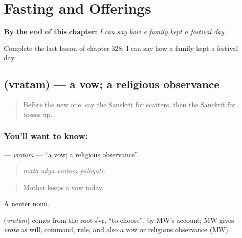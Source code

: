 
\chapter{Fasting and Offerings}
\label{ch:sa-fasting-and-offerings}

\begin{chapteropening}
\textbf{By the end of this chapter:} \emph{I can say how a family kept a festival day.}

Complete the last lesson of chapter 328: I can say how a family kept a festival day.
\end{chapteropening}

\section[\texorpdfstring{\sk{व्रतम्} (vratam)}{व्रतम् (vratam)}]{ (vratam) — a vow; a religious observance}

\label{lesson:SA-C328-vratam}



\begin{quote}
Before the new one: say the Sanskrit for scatters, then the Sanskrit for tosses up.
\end{quote}

\subsection*{You'll want to know: }
\textbf{} — \emph{vratam} — \textquotedblleft{}a vow; a religious observance\textquotedblright{}.

\begin{quote}
   
\end{quote}

\begin{quote}
\emph{mātā adya vrataṃ pālayati.}
\end{quote}

\begin{quote}
Mother keeps a vow today.
\end{quote}

A neuter noun.

\begin{cousinweb}
\textbf{} (\emph{vratam}) comes from the root √vṛ, \textquotedblleft{}to choose\textquotedblright{}, by MW's account; MW gives \emph{vrata} as will, command, rule, and also a vow or religious observance (MW).
\end{cousinweb}

